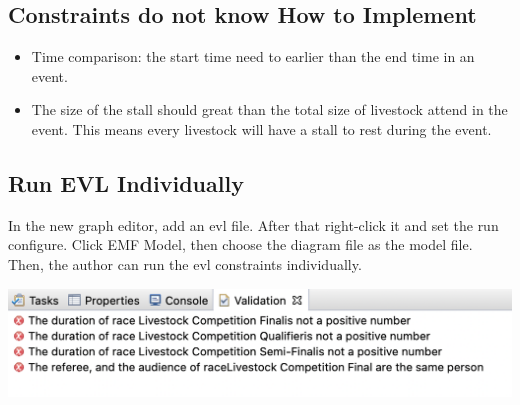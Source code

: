 \documentclass[12pt]{article}
\begin{document}
\subsection{Constraints do not know How to Implement}
\begin{itemize}
    \item Time comparison: the start time need to earlier than the end time in an event.
    \item The size of the stall should great than the total size of livestock attend in the event. This means every livestock 
    will have a stall to rest during the event.
\end{itemize}

\subsection{Run EVL Individually}
In the new graph editor, add an evl file. After that right-click it and set the run configure. 
Click EMF Model, then choose the diagram file as the model file. Then, the author can run the evl constraints individually.

\includegraphics[scale = 0.6]{img/constraint-error}
\end{document}
